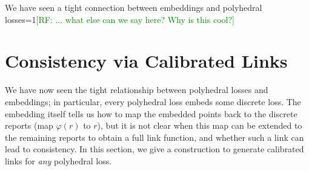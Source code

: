 \documentclass[12pt]{article}
\newcommand{\Comments}{1}
\newcommand{\mynote}[2]{\ifnum\Comments=1\textcolor{#1}{#2}\fi}
\newcommand{\raf}[1]{\mynote{green}{[RF: #1]}}
\newtheorem{corollary}{Corollary}
\begin{document}
We have seen a tight connection between embeddings and polyhedral losses\raf{... what else can we say here?  Why is this cool?}



\section{Consistency via Calibrated Links}
\label{sec:calibration}

We have now seen the tight relationship between polyhedral losses and embeddings; in particular, every polyhedral loss embeds some discrete loss.
The embedding itself tells us how to map the embedded points back to the discrete reports (map $\varphi(r)$ to $r$), but it is not clear when this map can be extended to the remaining reports to obtain a full link function, and whether such a link can lead to consistency.
In this section, we give a construction to generate calibrated links for \emph{any} polyhedral loss.
\end{document}
